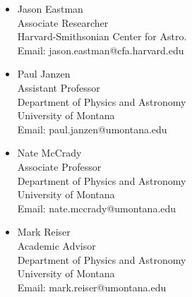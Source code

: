 \documentclass{article}
\begin{document}
\begin{multicols}{2}

\begin{itemize}

\item[] Jason Eastman\\
\hspace{5mm}Associate Researcher\\
\hspace{5mm}Harvard-Smithsonian Center for Astro.\\
\hspace{5mm}Email:   jason.eastman@cfa.harvard.edu

\item[] Paul Janzen \\
\hspace{5mm}Assistant Professor\\
\hspace{5mm}Department of Physics and Astronomy\\
\hspace{5mm}University of Montana\\
\hspace{5mm}Email:   paul.janzen@umontana.edu

\end{itemize}

\begin{itemize}

\item[] Nate McCrady \\
\hspace{5mm}Associate Professor\\
\hspace{5mm}Department of Physics and Astronomy\\
\hspace{5mm}University of Montana\\
\hspace{5mm}Email:   nate.mccrady@umontana.edu

\item[] Mark Reiser\\
\hspace{5mm}Academic Advisor\\
\hspace{5mm}Department of Physics and Astronomy\\
\hspace{5mm}University of Montana\\
\hspace{5mm}Email:   mark.reiser@umontana.edu

\end{itemize}

\end{multicols}

\fi
\end{document}
